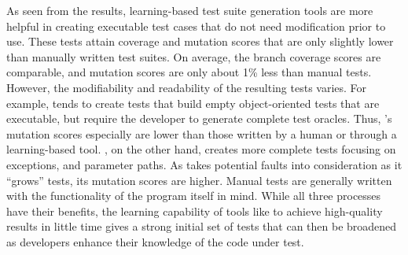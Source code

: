As seen from the results, learning-based test suite generation tools are more helpful in creating executable test cases that do not need modification prior to use.  These tests attain coverage and mutation scores that are only slightly lower than manually written test suites.  On average, the branch coverage scores are comparable, and mutation scores are only about 1\% less than manual tests.  However, the modifiability and readability of the resulting tests varies.  For example, \codepro tends to create tests that build empty object-oriented tests that are executable, but require the developer to generate complete test oracles.  Thus, \codepro's mutation scores especially are lower than those written by a human or through a learning-based tool.  \evo, on the other hand, creates more complete tests focusing on exceptions, and parameter paths.  As \evo takes potential faults into consideration as it ``grows'' tests, its mutation scores are higher.  Manual tests are generally written with the functionality of the program itself in mind.  While all three processes have their benefits, the learning capability of tools like \evo to achieve high-quality results in little time gives a strong initial set of tests that can then be broadened as developers enhance their knowledge of the code under test.

